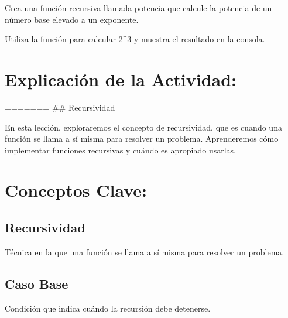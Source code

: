 \documentclass[
  a4paper,
  DIV=11,
  numbers=noendperiod,
  onepage,
  openany]{scrreprt}
\begin{document}
\begin{tcolorbox}[enhanced jigsaw, colbacktitle=quarto-callout-important-color!10!white, toprule=.15mm, leftrule=.75mm, titlerule=0mm, opacityback=0, rightrule=.15mm, opacitybacktitle=0.6, breakable, left=2mm, coltitle=black, title=\textcolor{quarto-callout-important-color}{\faExclamation}\hspace{0.5em}{Actividad Práctica:}, toptitle=1mm, bottomtitle=1mm, arc=.35mm, bottomrule=.15mm, colback=white, colframe=quarto-callout-important-color-frame]

Crea una función recursiva llamada potencia que calcule la potencia de
un número base elevado a un exponente.

Utiliza la función para calcular 2\^{}3 y muestra el resultado en la
consola.

\end{tcolorbox}

\hypertarget{explicaciuxf3n-de-la-actividad-44}{%
\section{Explicación de la
Actividad:}\label{explicaciuxf3n-de-la-actividad-44}}

======= \#\# Recursividad

En esta lección, exploraremos el concepto de recursividad, que es cuando
una función se llama a sí misma para resolver un problema. Aprenderemos
cómo implementar funciones recursivas y cuándo es apropiado usarlas.

\hypertarget{conceptos-clave-47}{%
\section{Conceptos Clave:}\label{conceptos-clave-47}}

\hypertarget{recursividad-2}{%
\subsection{Recursividad}\label{recursividad-2}}

Técnica en la que una función se llama a sí misma para resolver un
problema.

\hypertarget{caso-base-1}{%
\subsection{Caso Base}\label{caso-base-1}}

Condición que indica cuándo la recursión debe detenerse.
\end{document}
